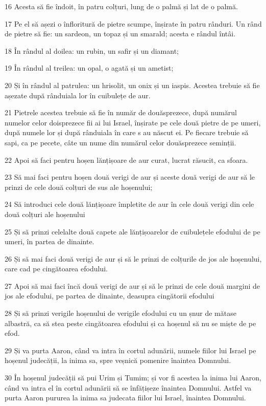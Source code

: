 \par 16 Acesta să fie îndoit, în patru colțuri, lung de o palmă și lat de o palmă.
\par 17 Pe el să așezi o înfloritură de pietre scumpe, înșirate în patru rânduri. Un rând de pietre să fie: un sardeon, un topaz și un smarald; acesta e rândul întâi.
\par 18 În rândul al doilea: un rubin, un safir și un diamant;
\par 19 În rândul al treilea: un opal, o agată și un ametist;
\par 20 Și în rândul al patrulea: un hrisolit, un onix și un iaspis. Acestea trebuie să fie așezate după rânduiala lor în cuibulețe de aur.
\par 21 Pietrele acestea trebuie să fie în număr de douăsprezece, după numărul numelor celor doisprezece fii ai lui Israel, înșirate pe cele două pietre de pe umeri, după numele lor și după rânduiala în care s au născut ei. Pe fiecare trebuie să sapi, ca pe pecete, câte un nume din numărul celor douăsprezece seminții.
\par 22 Apoi să faci pentru hoșen lănțișoare de aur curat, lucrat răsucit, ca sfoara.
\par 23 Să mai faci pentru hoșen două verigi de aur și aceste două verigi de aur să le prinzi de cele două colțuri de sus ale hoșenului;
\par 24 Să introduci cele două lănțișoare împletite de aur în cele două verigi din cele două colțuri ale hoșenului
\par 25 Și să prinzi celelalte două capete ale lănțișoarelor de cuibulețele efodului de pe umeri, în partea de dinainte.
\par 26 Și să mai faci două verigi de aur și să le prinzi de colțurile de jos ale hoșenului, care cad pe cingătoarea efodului.
\par 27 Apoi să mai faci încă două verigi de aur și să le prinzi de cele două margini de jos ale efodului, pe partea de dinainte, deasupra cingătorii efodului
\par 28 Și să prinzi verigile hoșenului de verigile efodului cu un șnur de mătase albastră, ca să stea peste cingătoarea efodului și ca hoșenul să nu se miște de pe efod.
\par 29 Și va purta Aaron, când va intra în cortul adunării, numele fiilor lui Israel pe hoșenul judecății, la inima sa, spre veșnică pomenire înaintea Domnului.
\par 30 În hoșenul judecății să pui Urim și Tumim; și vor fi acestea la inima lui Aaron, când va intra el în cortul adunării să se înfățișeze înaintea Domnului. Astfel va purta Aaron pururea la inima sa judecata fiilor lui Israel, înaintea Domnului.

